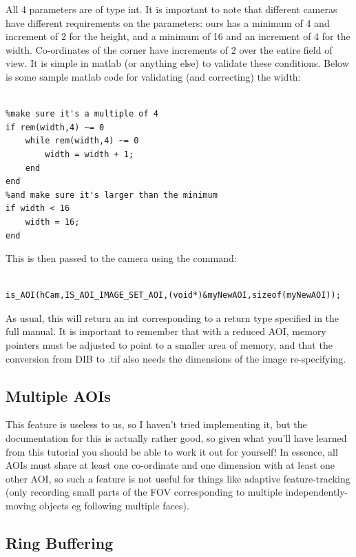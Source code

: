 \documentclass[12pt,a4paper]{article}
\begin{document}
All 4 parameters are of type int. It is important to note that different cameras have different requirements on the parameters: ours has a minimum of 4 and increment of 2 for the height, and a minimum of 16 and an increment of 4 for the width. Co-ordinates of the corner have increments of 2 over the entire field of view. It is simple in matlab (or anything else) to validate these conditions. Below is some sample matlab code for validating (and correcting) the width:

\lstset{language=matlab}
\begin{lstlisting}

%make sure it's a multiple of 4
if rem(width,4) ~= 0
    while rem(width,4) ~= 0
        width = width + 1;
    end
end
%and make sure it's larger than the minimum
if width < 16
    width = 16;
end

\end{lstlisting}

This is then passed to the camera using the command:

\lstset{language=C++}
\begin{lstlisting}

is_AOI(hCam,IS_AOI_IMAGE_SET_AOI,(void*)&myNewAOI,sizeof(myNewAOI));

\end{lstlisting}

As usual, this will return an int corresponding to a return type specified in the full manual. It is important to remember that with a reduced AOI, memory pointers must be adjusted to point to a smaller area of memory, and that the conversion from DIB to .tif also needs the dimensions of the image re-specifying.

\subsection{Multiple AOIs}

This feature is useless to us, so I haven't tried implementing it, but the documentation for this is actually rather good, so given what you'll have learned from this tutorial you should be able to work it out for yourself! In essence, all AOIs must share at least one co-ordinate and one dimension with at least one other AOI, so such a feature is not useful for things like adaptive feature-tracking (only recording small parts of the FOV corresponding to multiple independently-moving objects eg following multiple faces).

\subsection{Ring Buffering}
\end{document}
